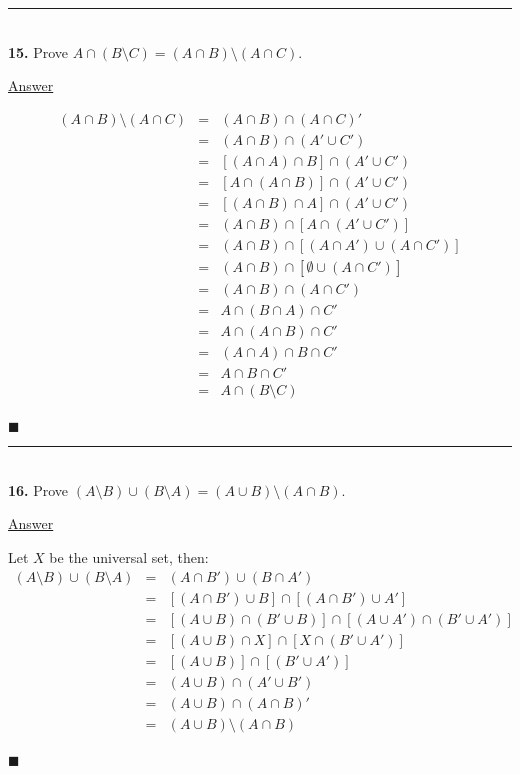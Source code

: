 \documentclass{article}[10pt]
\newenvironment{exercise}[1]
    {\noindent\rule{2cm}{0.4pt} \\
     \textbf{#1.}}
    {}
\newcommand{\answer}{

  \underline{Answer}

}
\newcommand{\qed}{

\hfill\ensuremath{\blacksquare}

}
\begin{document}
\begin{exercise}{15}
  Prove $A \cap (B \setminus C) = (A \cap B) \setminus (A \cap C)$.
  \answer
  \[\begin{array}{rcl}
    (A \cap B) \setminus (A \cap C)
    &=& (A \cap B) \cap (A \cap C)' \\
    &=& (A \cap B) \cap (A' \cup C') \\
    &=& \left[ (A \cap A) \cap B \right] \cap (A' \cup C') \\
    &=& \left[ A \cap (A \cap B) \right] \cap (A' \cup C') \\
    &=& \left[ (A \cap B) \cap A \right] \cap (A' \cup C') \\
    &=& (A \cap B) \cap \left[ A \cap (A' \cup C') \right] \\
    &=& (A \cap B) \cap \left[ (A \cap A') \cup (A \cap C') \right] \\
    &=& (A \cap B) \cap \left[ \emptyset \cup (A \cap C') \right] \\
    &=& (A \cap B) \cap (A \cap C') \\
    &=& A \cap (B \cap A) \cap C' \\
    &=& A \cap (A \cap B) \cap C' \\
    &=& (A \cap A) \cap B \cap C' \\
    &=& A \cap B \cap C' \\
    &=& A \cap (B \setminus C) \\
  \end{array}\]
  \qed
\end{exercise}


\begin{exercise}{16}
  Prove $(A \setminus B) \cup (B \setminus A) =
         (A \cup B) \setminus (A \cap B)$.
  \answer
  Let $X$ be the universal set, then:
  \[\begin{array}{rcl}
    (A \setminus B) \cup (B \setminus A)
    &=& (A \cap B') \cup (B \cap A') \\
    &=& \left[ (A \cap B') \cup B \right] \cap
        \left[ (A \cap B') \cup A' \right] \\
    &=& \left[ (A \cup B) \cap (B' \cup B) \right] \cap
        \left[ (A \cup A') \cap (B' \cup A') \right] \\
    &=& \left[ (A \cup B) \cap X \right] \cap
        \left[ X \cap (B' \cup A') \right] \\
    &=& \left[ (A \cup B) \right] \cap
        \left[ (B' \cup A') \right] \\
    &=& (A \cup B) \cap (A' \cup B') \\
    &=& (A \cup B) \cap (A \cap B)' \\
    &=& (A \cup B) \setminus (A \cap B) \\
  \end{array}\]
  \qed
\end{exercise}
\end{document}
